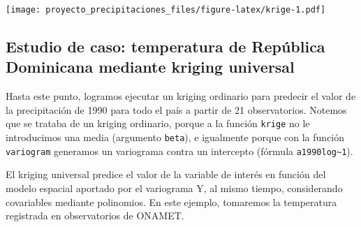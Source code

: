 \documentclass[11pt,]{article}
\newenvironment{Shaded}{\begin{snugshade}}{\end{snugshade}}
\newcommand{\KeywordTok}[1]{\textcolor[rgb]{0.13,0.29,0.53}{\textbf{#1}}}
\newcommand{\DataTypeTok}[1]{\textcolor[rgb]{0.13,0.29,0.53}{#1}}
\newcommand{\DecValTok}[1]{\textcolor[rgb]{0.00,0.00,0.81}{#1}}
\newcommand{\StringTok}[1]{\textcolor[rgb]{0.31,0.60,0.02}{#1}}
\newcommand{\OperatorTok}[1]{\textcolor[rgb]{0.81,0.36,0.00}{\textbf{#1}}}
\newcommand{\NormalTok}[1]{#1}
\begin{document}
\begin{Shaded}
\end{Shaded}

\texttt{[image: proyecto\_precipitaciones\_files/figure-latex/krige-1.pdf]}

\subsection{Estudio de caso: temperatura de República Dominicana
mediante kriging
universal}\label{estudio-de-caso-temperatura-de-repuxfablica-dominicana-mediante-kriging-universal}

Hasta este punto, logramos ejecutar un kriging ordinario para predecir
el valor de la precipitación de 1990 para todo el país a partir de 21
observatorios. Notemos que se trataba de un kriging ordinario, porque a
la función \texttt{krige} no le introducimos una media (argumento
\texttt{beta}), e igualmente porque con la función \texttt{variogram}
generamos un variograma contra un intercepto (fórmula
\texttt{a1990log\textasciitilde{}1}).

El kriging universal predice el valor de la variable de interés en
función del modelo espacial aportado por el variograma Y, al mismo
tiempo, considerando covariables mediante polinomios. En este ejemplo,
tomaremos la temperatura registrada en observatorios de ONAMET.
\end{document}
